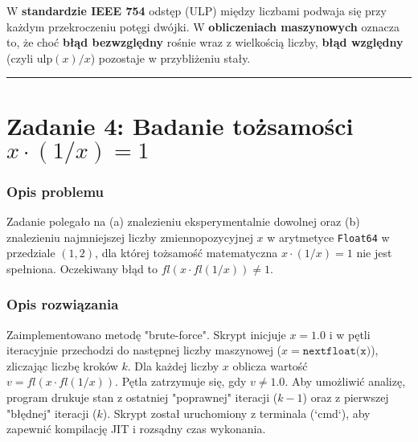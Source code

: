 \documentclass[11pt, a4paper]{article}
\newcommand{\taskseparator}{\leavevmode\leaders\hrule height 0.5pt\hfill\kern0pt}
\begin{document}
W \textbf{standardzie IEEE 754} odstęp (ULP) między liczbami podwaja się przy każdym przekroczeniu potęgi dwójki. W \textbf{obliczeniach maszynowych} oznacza to, że choć \textbf{błąd bezwzględny} rośnie wraz z wielkością liczby, \textbf{błąd względny} (czyli $\text{ulp}(x) / x$) pozostaje w przybliżeniu stały.

\taskseparator

\section{Zadanie 4: Badanie tożsamości \texorpdfstring{$x \cdot (1/x) = 1$}{x * (1/x) = 1}}

\subsubsection{Opis problemu}
Zadanie polegało na (a) znalezieniu eksperymentalnie dowolnej oraz (b) znalezieniu  najmniejszej  liczby zmiennopozycyjnej $x$ w arytmetyce \texttt{Float64} w przedziale $(1, 2)$, dla której tożsamość matematyczna $x \cdot (1/x) = 1$ nie jest spełniona. Oczekiwany błąd to $fl(x \cdot fl(1/x)) \neq 1$.

\subsubsection{Opis rozwiązania}
Zaimplementowano metodę "brute-force". Skrypt inicjuje $x = 1.0$ i w pętli iteracyjnie przechodzi do następnej liczby maszynowej ($x = \texttt{nextfloat(x)}$), zliczając liczbę kroków $k$. Dla każdej liczby $x$ oblicza wartość $v = fl(x \cdot fl(1/x))$. Pętla zatrzymuje się, gdy $v \neq 1.0$. Aby umożliwić analizę, program drukuje stan z ostatniej "poprawnej" iteracji ($k-1$) oraz z pierwszej "błędnej" iteracji ($k$). Skrypt został uruchomiony z terminala (`cmd`), aby zapewnić kompilację JIT i rozsądny czas wykonania.
\end{document}
